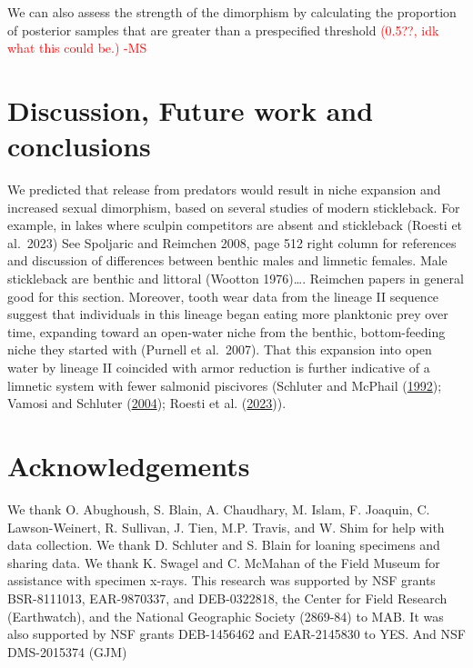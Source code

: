 \documentclass[
  12pt,
]{article}
\begin{document}
We can also assess the strength of the dimorphism by calculating the
proportion of posterior samples that are greater than a prespecified
threshold \textcolor{red}{(0.5??, idk what this could be.) -MS}

\hypertarget{sec:conclusions}{%
\section{Discussion, Future work and
conclusions}\label{sec:conclusions}}

We predicted that release from predators would result in niche expansion
and increased sexual dimorphism, based on several studies of modern
stickleback. For example, in lakes where sculpin competitors are absent
and stickleback (Roesti et al.~2023) See Spoljaric and Reimchen 2008,
page 512 right column for references and discussion of differences
between benthic males and limnetic females. Male stickleback are benthic
and littoral (Wootton 1976)\ldots. Reimchen papers in general good for
this section. Moreover, tooth wear data from the lineage II sequence
suggest that individuals in this lineage began eating more planktonic
prey over time, expanding toward an open-water niche from the benthic,
bottom-feeding niche they started with (Purnell et al.~2007). That this
expansion into open water by lineage II coincided with armor reduction
is further indicative of a limnetic system with fewer salmonid
piscivores (Schluter and McPhail
(\protect\hyperlink{ref-SchluterandMcPhail1992}{1992}); Vamosi and
Schluter (\protect\hyperlink{ref-VamosiandSchluter2004}{2004}); Roesti
et al. (\protect\hyperlink{ref-Roestietal2023}{2023})).

\hypertarget{sec:acknowl}{%
\section{Acknowledgements}\label{sec:acknowl}}

We thank O. Abughoush, S. Blain, A. Chaudhary, M. Islam, F. Joaquin, C.
Lawson-Weinert, R. Sullivan, J. Tien, M.P. Travis, and W. Shim for help
with data collection. We thank D. Schluter and S. Blain for loaning
specimens and sharing data. We thank K. Swagel and C. McMahan of the
Field Museum for assistance with specimen x-rays. This research was
supported by NSF grants BSR-8111013, EAR-9870337, and DEB-0322818, the
Center for Field Research (Earthwatch), and the National Geographic
Society (2869-84) to MAB. It was also supported by NSF grants
DEB-1456462 and EAR-2145830 to YES. And NSF DMS-2015374 (GJM)
\end{document}
